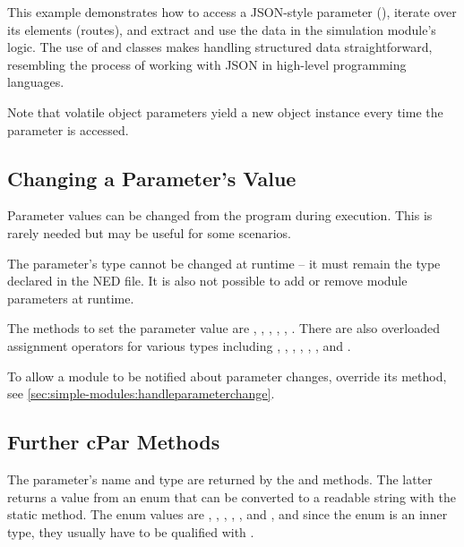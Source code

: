This example demonstrates how to access a JSON-style parameter (),
iterate over its elements (routes), and extract and use the data in the
simulation module's logic. The use of  and
 classes makes handling structured data straightforward,
resembling the process of working with JSON in high-level programming languages.

Note that volatile object parameters yield a new object instance every time
the parameter is accessed.


\subsection{Changing a Parameter's Value}
\label{sec:simple-modules:setting-parameters}

Parameter values can be changed from the program during execution. This is
rarely needed but may be useful for some scenarios.

\begin{note}
    The parameter's type cannot be changed at runtime -- it must
    remain the type declared in the NED file. It is also not possible
    to add or remove module parameters at runtime.
\end{note}

The methods to set the parameter value are ,
, ,
, , .
There are also overloaded assignment operators for various types including
, , , , ,
, and .

To allow a module to be notified about parameter changes, override
its  method, see
\ref{sec:simple-modules:handleparameterchange}.


\subsection{Further cPar Methods}
\label{sec:simple-modules:further-cpar-methods}

The parameter's name and type are returned by the  and
 methods. The latter returns a value from an enum that can be
converted to a readable string with the  static method. The
enum values are , , , , ,
and , and since the enum is an inner type, they usually have to be
qualified with .

